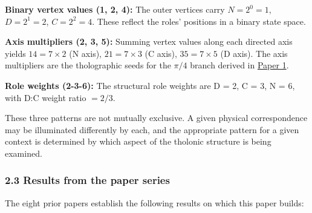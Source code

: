 \documentclass[
  11pt,
  letterpaper,
]{article}
\begin{document}
\textbf{Binary vertex values (1, 2, 4):} The outer vertices carry
\(N = 2^0 = 1\), \(D = 2^1 = 2\), \(C = 2^2 = 4\). These reflect the
roles' positions in a binary state space.

\textbf{Axis multipliers (2, 3, 5):} Summing vertex values along each
directed axis yields \(14 = 7 \times 2\) (N axis), \(21 = 7 \times 3\)
(C axis), \(35 = 7 \times 5\) (D axis). The axis multipliers are the
tholographic seeds for the \(\pi/4\) branch derived in
\href{https://github.com/baardev/truevalue/blob/main/docnav/Research/papers/1_recursive-tholonic-five-constants/1_recursive-tholonic-five-constants.pdf}{Paper
1}.

\textbf{Role weights (2-3-6):} The structural role weights are D = 2, C
= 3, N = 6, with D:C weight ratio \(= 2/3\).

These three patterns are not mutually exclusive. A given physical
correspondence may be illuminated differently by each, and the
appropriate pattern for a given context is determined by which aspect of
the tholonic structure is being examined.

\subsubsection{2.3 Results from the paper
series}\label{results-from-the-paper-series}

The eight prior papers establish the following results on which this
paper builds:
\end{document}
